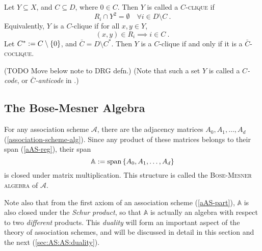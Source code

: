 \documentclass{report}
\newcommand{\AS}{\mathcal{A}}
\newcommand{\BMA}{\mathbb{A}}
\begin{document}
    \begin{defn}
      \label{AS-clique}
      Let $Y \subseteq X$, and $C \subseteq D$, where $0 \in C$.
      Then $Y$ is called a \textsc{$C$-clique} if
      $$
        R_i \cap Y^2 = \emptyset \quad \forall i \in D \setminus C
        \ .
      $$
      Equivalently, $Y$ is a $C$-clique if for all $x, y \in Y$,
      $$
        (x, y) \in R_i \implies i \in C
        \ .
      $$
      Let $C^* := C \setminus \left\lbrace 0 \right\rbrace$, and $\bar{C} = D \setminus C^*$.
      Then $Y$ is a $C$-clique if and only if it is a
      \textsc{$\bar{C}$-coclique}.

      (TODO Move below note to DRG defn.)
      (Note that such a set $Y$ is called a \textit{$C$-code},
      or \textit{$\bar{C}$-anticode} in \cite{godsil}.)
    \end{defn}

    \subsection{The Bose-Mesner Algebra}\label{sec:AS:AS:BMA}
      For any association scheme $\AS$,
      there are the adjacency matrices
      $A_0, A_1, \ldots, A_d$ (\ref{association-scheme-alg}).
      Since any product of these matrices belongs to their span (\ref{aAS-reg}),
      their span
      \begin{equation}\label{BMA}
        \BMA := \Span\set{A_0, A_1, \ldots, A_d}
      \end{equation}
      is closed under matrix multiplication.  This structure is called the
      \textsc{Bose-Mesner algebra} of $\AS$.

      Note also that from the first axiom of an association scheme
      (\ref{aAS-part}), $\BMA$ is also closed under the \textit{Schur product},
      so that $\BMA$ is actually an algebra with respect to two
      \textit{different} products.
      This \textit{duality} will form an important aspect of the theory of
      association schemes, and will be discussed in detail in this section and
      the next (\ref{sec:AS:AS:duality}).
\end{document}
